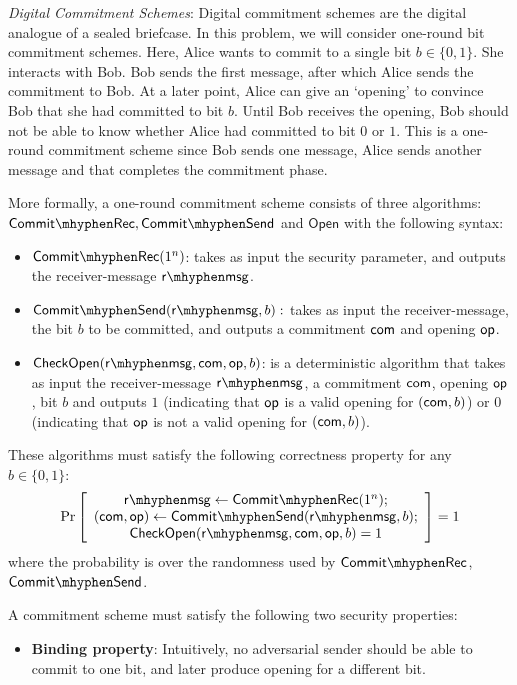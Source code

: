 \documentclass[10pt,addpoints]{exam}
\newcommand{\open}{\mathsf{Open}}
\newcommand{\prob}[1]{\Pr\left[ #1 \right]}
\begin{document}
\begin{questions}
\emph{Digital Commitment Schemes}: Digital commitment schemes are the digital analogue of a sealed briefcase. In this problem, we will consider one-round bit commitment schemes. Here, Alice wants to commit to a single bit $b \in \{0,1\}$. She interacts with Bob. Bob sends the first message, after which Alice sends the commitment to Bob. At a later point, Alice can give an `opening' to convince Bob that she had committed to bit $b$. Until Bob receives the opening, Bob should not be able to know whether Alice had committed to bit $0$ or $1$. This is a one-round commitment scheme since Bob sends one message, Alice sends another message and that completes the commitment phase. 

More formally, a one-round commitment scheme consists of three algorithms: $\commitrec, \commitsend$ and $\open$ with the following syntax: 
\begin{itemize}
     \item $\commitrec(1^n)$: takes as input the security parameter, and outputs the receiver-message $\rmsg$.
     \item $\commitsend(\rmsg, b): $ takes as input the receiver-message, the bit $b$ to be committed, and outputs a commitment $\mathsf{com}$ and opening $\mathsf{op}$. 
     \item $\checkopen(\rmsg, \com, \op, b)$: is a deterministic algorithm that takes as input the receiver-message $\rmsg$, a commitment $\mathsf{com}$, opening $\mathsf{op}$, bit $b$ and outputs $1$ (indicating that $\mathsf{op}$ is a valid opening for $(\mathsf{com}, b)$) or $0$ (indicating that $\mathsf{op}$ is not a valid opening for $(\mathsf{com}, b)$).
\end{itemize} 

These algorithms must satisfy the following correctness property for any $b\in \{0,1\}$: 
\[
\prob{
\begin{array}{c}
\rmsg \gets \commitrec(1^n);\\ (\com, \op) \gets \commitsend(\rmsg, b);\\ \checkopen(\rmsg, \com, \op, b) = 1
\end{array}
} = 1
\]
where the probability is over the randomness used by $\commitrec$, $\commitsend$. 


\vspace{10pt}

A commitment scheme must satisfy the following two security properties: 

\begin{itemize}
    \item \textbf{Binding property}: Intuitively, no adversarial sender should be able to commit to one bit, and later produce opening for a different bit. 



\end{itemize}
\end{questions}
\end{document}
